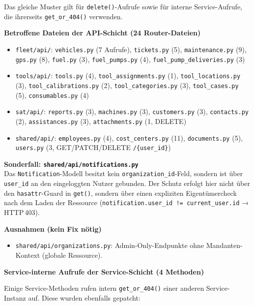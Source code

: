 Das gleiche Muster gilt für \texttt{delete()}-Aufrufe sowie für interne
Service-Aufrufe, die ihrerseits \texttt{get\_or\_404()} verwenden.

\textbf{Betroffene Dateien der API-Schicht (24 Router-Dateien)}

\begin{itemize}
    \item \texttt{fleet/api/}: \texttt{vehicles.py} (7 Aufrufe),
          \texttt{tickets.py} (5), \texttt{maintenance.py} (9),
          \texttt{gps.py} (8), \texttt{fuel.py} (3),
          \texttt{fuel\_pumps.py} (4), \texttt{fuel\_pump\_deliveries.py} (3)
    \item \texttt{tools/api/}: \texttt{tools.py} (4),
          \texttt{tool\_assignments.py} (1), \texttt{tool\_locations.py} (3),
          \texttt{tool\_calibrations.py} (2), \texttt{tool\_categories.py} (3),
          \texttt{tool\_cases.py} (5), \texttt{consumables.py} (4)
    \item \texttt{sat/api/}: \texttt{reports.py} (3), \texttt{machines.py} (3),
          \texttt{customers.py} (3), \texttt{contacts.py} (2),
          \texttt{assistances.py} (3), \texttt{attachments.py} (1, DELETE)
    \item \texttt{shared/api/}: \texttt{employees.py} (4),
          \texttt{cost\_centers.py} (11), \texttt{documents.py} (5),
          \texttt{users.py} (3, GET/PATCH/DELETE \texttt{/\{user\_id\}})
\end{itemize}

\textbf{Sonderfall: \texttt{shared/api/notifications.py}}\\%
Das \texttt{Notification}-Modell besitzt kein \texttt{organization\_id}-Feld,
sondern ist über \texttt{user\_id} an den eingeloggten Nutzer gebunden.
Der Schutz erfolgt hier nicht über den \texttt{hasattr}-Guard in \texttt{get()},
sondern über einen expliziten Eigentümercheck nach dem Laden der Ressource
(\texttt{notification.user\_id != current\_user.id} → HTTP\,403).

\textbf{Ausnahmen (kein Fix nötig)}
\begin{itemize}
    \item \texttt{shared/api/organizations.py}: Admin-Only-Endpunkte ohne
          Mandanten-Kontext (globale Ressource).
\end{itemize}

\textbf{Service-interne Aufrufe der Service-Schicht (4 Methoden)}

Einige Service-Methoden rufen intern \texttt{get\_or\_404()} einer anderen
Service-Instanz auf. Diese wurden ebenfalls gepatcht:

